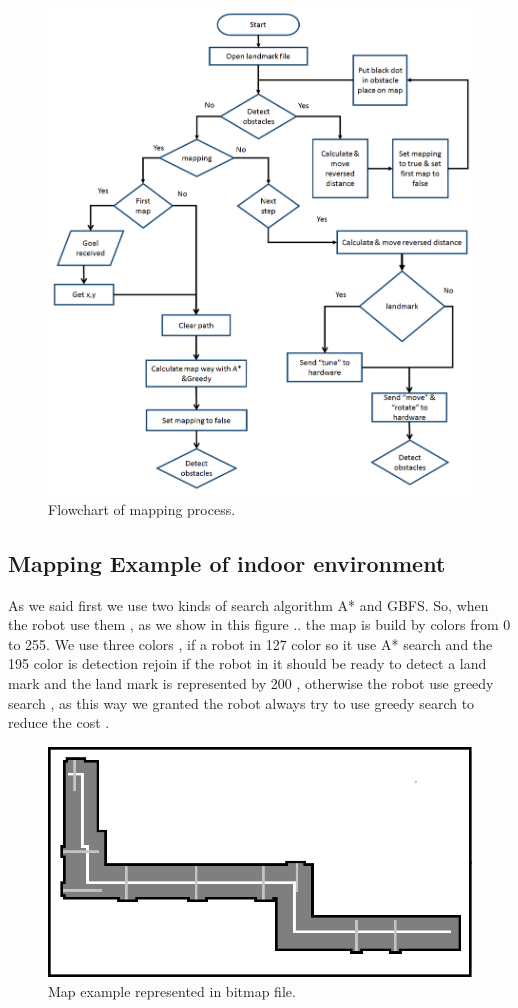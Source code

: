 \documentclass[12pt]{article}
\begin{document}
\begin{figure}
	\centering
	\includegraphics[width =1\textwidth]{Fig/mapping-flowchart.png}
	\caption{Flowchart of mapping process.}
	\label{fig:map-flowchart}
\end{figure}

\subsection{Mapping Example of indoor environment}
As we said first we use two kinds of search algorithm A* and GBFS. So, when the robot use them , as we show in this figure .. the map is build by colors from 0 to 255. 
We use three colors  , if a robot in 127 color so it use A* search and the 195 color is detection rejoin if the robot in it  should be ready to detect a land mark and the land mark is represented by 200 , otherwise the robot use greedy search , as this way we granted the robot always try to use greedy search to reduce the cost .

\begin{figure}[H]
	\centering
	\includegraphics[width =.5\textwidth]{Fig/map-example.png}
	\caption{Map example represented in bitmap file.}
	\label{fig:map-example}
\end{figure}
\end{document}
